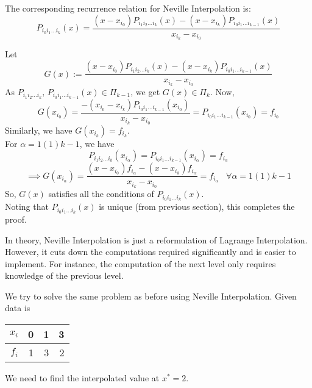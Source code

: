 \begin{props}
    The corresponding recurrence relation for Neville Interpolation is:
    $$P_{i_0i_1\dots i_k}(x) = \frac{(x-x_{i_0})P_{i_1i_2\dots i_k}(x)-(x-x_{i_k})P_{i_0i_1\dots i_{k-1}}(x)}{x_{i_k} - x_{i_0}}$$
\end{props}
\begin{prf}
    Let $$G(x):=\frac{(x-x_{i_0})P_{i_1i_2\dots i_k}(x)-(x-x_{i_k})P_{i_0i_1\dots i_{k-1}}(x)}{x_{i_k} - x_{i_0}}$$
    As $P_{i_1i_2\dots i_k}\text{, }P_{i_0i_1\dots i_{k-1}}(x) \in \Pi_{k-1}$, we get $G(x) \in \Pi_k$.
    Now, $$G(x_{i_0}) = \frac{-(x_{i_0}-x_{i_k})P_{i_0i_1\dots i_{k-1}}(x_{i_0})}{x_{i_k} - x_{i_0}} =  P_{i_0i_1\dots i_{k-1}}(x_{i_0}) = f_{i_0}$$
    Similarly, we have $G(x_{i_k}) = f_{i_k}$.\\
    For $\alpha = 1(1)k-1$, we have 
    $$P_{i_1i_2\dots i_k}(x_{i_\alpha}) = P_{i_0i_1\dots i_{k-1}}(x_{i_\alpha}) = f_{i_\alpha}$$
    $$\implies G(x_{i_\alpha}) = \frac{(x-x_{i_0})f_{i_\alpha}-(x-x_{i_k})f_{i_\alpha}}{x_{i_k} - x_{i_0}} = f_{i_\alpha}\;\;\;\forall \alpha = 1(1)k-1$$
    So, $G(x)$ satisfies all the conditions of $P_{i_0i_1\dots i_k}(x)$.\\
    Noting that $P_{i_0i_1\dots i_k}(x)$ is unique (from previous section), this completes the proof.
\end{prf}
\begin{rmark}
    In theory, Neville Interpolation is just a reformulation of Lagrange Interpolation. However, it cuts down the computations required significantly and is easier to implement. For instance, the computation of the next level only requires knowledge of the previous level.
\end{rmark}

\begin{example}
    We try to solve the same problem as before using Neville Interpolation. Given data is
    \begin{center}
        \begin{tabular}{|r||r|r|r|}
            \hline
            $x_i$ & 0 & 1 & 3 \\
            \hline
            $f_i$ & 1 & 3 & 2 \\
            \hline
        \end{tabular}
    \end{center}
    We need to find the interpolated value at $x^* = 2$.
\end{example}

